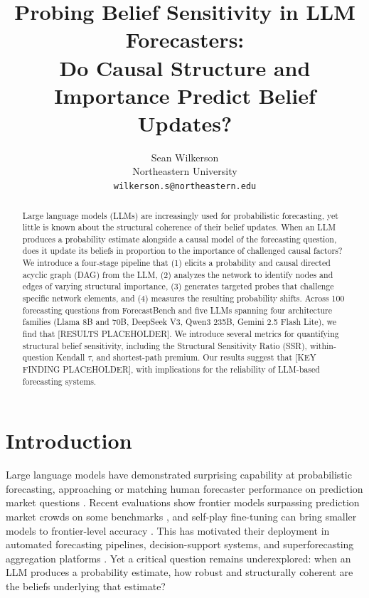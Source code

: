 \documentclass[11pt]{article}
\title{Probing Belief Sensitivity in LLM Forecasters:\\
Do Causal Structure and Importance Predict Belief Updates?}
\author{
  Sean Wilkerson \\
  Northeastern University \\
  \texttt{wilkerson.s@northeastern.edu}
}
\begin{document}
\maketitle

\begin{abstract}
Large language models (LLMs) are increasingly used for probabilistic forecasting, yet little is known about the structural coherence of their belief updates. When an LLM produces a probability estimate alongside a causal model of the forecasting question, does it update its beliefs in proportion to the importance of challenged causal factors? We introduce a four-stage pipeline that (1) elicits a probability and causal directed acyclic graph (DAG) from the LLM, (2) analyzes the network to identify nodes and edges of varying structural importance, (3) generates targeted probes that challenge specific network elements, and (4) measures the resulting probability shifts. Across 100 forecasting questions from ForecastBench and five LLMs spanning four architecture families (Llama 8B and 70B, DeepSeek V3, Qwen3 235B, Gemini 2.5 Flash Lite), we find that [RESULTS PLACEHOLDER]. We introduce several metrics for quantifying structural belief sensitivity, including the Structural Sensitivity Ratio (SSR), within-question Kendall $\tau$, and shortest-path premium. Our results suggest that [KEY FINDING PLACEHOLDER], with implications for the reliability of LLM-based forecasting systems.
\end{abstract}

\section{Introduction}
\label{sec:intro}

Large language models have demonstrated surprising capability at probabilistic forecasting, approaching or matching human forecaster performance on prediction market questions \cite{halawi2024approaching, zou2024forecastbench}. Recent evaluations show frontier models surpassing prediction market crowds on some benchmarks \cite{lu2025evaluating}, and self-play fine-tuning can bring smaller models to frontier-level accuracy \cite{turtel2025teach}. This has motivated their deployment in automated forecasting pipelines, decision-support systems, and superforecasting aggregation platforms \cite{aia2025forecaster}. Yet a critical question remains underexplored: when an LLM produces a probability estimate, how robust and structurally coherent are the beliefs underlying that estimate?
\end{document}
